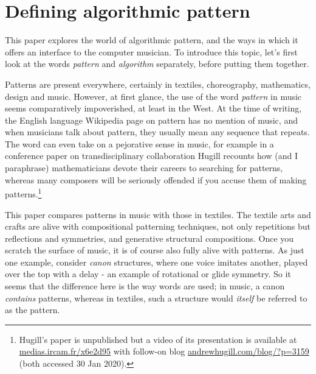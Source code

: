 \documentclass{nime-alternate} %
\begin{document}

\printccsdesc

\hypertarget{defining-algorithmic-pattern}{%
\section{Defining algorithmic
pattern}\label{defining-algorithmic-pattern}}

This paper explores the world of algorithmic pattern, and the ways in
which it offers an interface to the computer musician. To introduce this
topic, let's first look at the words \emph{pattern} and \emph{algorithm}
separately, before putting them together.

\sloppypar

Patterns are present everywhere, certainly in textiles, choreography,
mathematics, design and music. However, at first glance, the use of the
word \emph{pattern} in music seems comparatively impoverished, at least
in the West. At the time of writing, the English language Wikipedia page
on pattern has no mention of music, and when musicians talk about
pattern, they usually mean any sequence that repeats. The word can even
take on a pejorative sense in music, for example in a conference paper
on transdisciplinary collaboration Hugill recounts how (and I
paraphrase) mathematicians devote their careers to searching for
patterns, whereas many composers will be seriously offended if you
accuse them of making patterns.\footnote{Hugill's paper is unpublished
  but a video of its presentation is available at
  \href{https://medias.ircam.fr/x6e2d95}{medias.ircam.fr/x6e2d95} with
  follow-on blog
  \href{http://www.andrewhugill.com/blog/?p=3159}{andrewhugill.com/blog/?p=3159}
  (both accessed 30 Jan 2020).}

This paper compares patterns in music with those in textiles. The
textile arts and crafts are alive with compositional patterning
techniques, not only repetitions but reflections and symmetries, and
generative structural compositions. Once you scratch the surface of
music, it is of course also fully alive with patterns. As just one
example, consider \emph{canon} structures, where one voice imitates
another, played over the top with a delay - an example of rotational or
glide symmetry. So it seems that the difference here is the way words
are used; in music, a canon \emph{contains} patterns, whereas in
textiles, such a structure would \emph{itself} be referred to as the
pattern.
\end{document}
